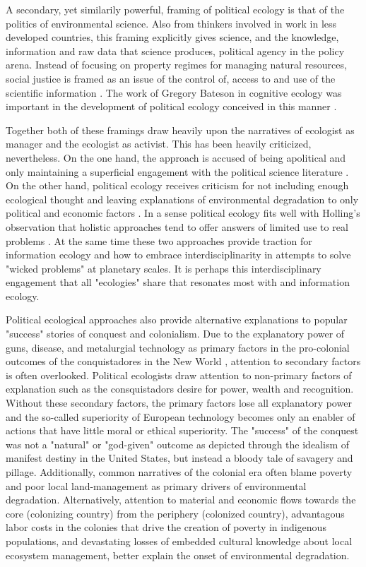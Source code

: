 A secondary, yet similarily powerful, framing of political ecology is that of the politics of environmental science. Also from thinkers involved in work in less developed countries, this framing explicitly gives science, and the knowledge, information and raw data that science produces, political agency in the policy arena. Instead of focusing on property regimes for managing natural resources, social justice is framed as an issue of the control of, access to and use of the scientific information \citep{forsyth_2003,leach_1996}. The work of Gregory Bateson in cognitive ecology was important in the development of political ecology conceived in this manner \citep{peet_1996}.

Together both of these framings draw heavily upon the narratives of ecologist as manager and the ecologist as activist. This has been heavily criticized, nevertheless. On the one hand, the approach is accused of being apolitical and only maintaining a superficial engagement with the political science literature \citep{walker_2007}. On the other hand, political ecology receives criticism for not including enough ecological thought and leaving explanations of environmental degradation to only political and economic factors \citep{vayda_1999,walker_2005}. In a sense political ecology fits well with Holling's observation that holistic approaches tend to offer answers of limited use to real problems \citep{holling_1998}. At the same time these two approaches provide traction for information ecology and how to embrace interdisciplinarity in attempts to solve "wicked problems" at planetary scales. It is perhaps this interdisciplinary engagement that all "ecologies" share that resonates most with and information ecology.

Political ecological approaches also provide alternative explanations to popular "success" stories of conquest and colonialism. Due to the explanatory power of guns, disease, and metalurgial technology as primary factors in the pro-colonial outcomes of the conquistadores in the New World \citep[cf.][]{diamond_1997}, attention to secondary factors is often overlooked. Political ecologists draw attention to non-primary factors of explanation such as the consquistadors desire for power, wealth and recognition. Without these secondary factors, the primary factors lose all explanatory power and the so-called superiority of European technology becomes only an enabler of actions that have little moral or ethical superiority. The "success" of the conquest was not a "natural" or "god-given" outcome as depicted through the idealism of manifest destiny in the United States, but instead a bloody tale of savagery and pillage. Additionally, common narratives of the colonial era often blame poverty and poor local land-management as primary drivers of environmental degradation. Alternatively, attention to material and economic flows towards the core (colonizing country) from the periphery (colonized country), advantagous labor costs in the colonies that drive the creation of poverty in indigenous populations, and devastating losses of embedded cultural knowledge about local ecosystem management, better explain the onset of environmental degradation.